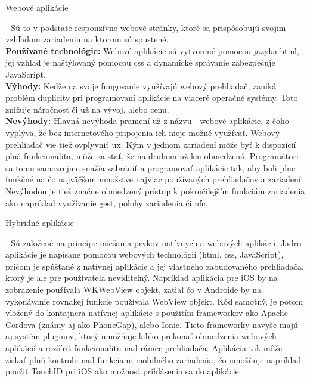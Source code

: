 \begin{itemize}[leftmargin=*]
{\bf \item Webové aplikácie} - Sú to v podstate responzívne webové stránky, ktoré sa prispôsobujú svojim vzhľadom zariadeniu na ktorom sú spustené. \cite{ma3} \\

{\bf Používané technológie:} Webové aplikácie sú vytvorené pomocou jazyka \acrshort{html}, jej vzhľad je naštýlovaný pomocou \acrshort{css} a dynamické správanie zabezpečuje JavaScript. \\

{\bf Výhody:} Keďže na svoje fungovanie využívajú webový prehliadač, zaniká problém duplicity pri programovaní aplikácie na viaceré operačné systémy. Toto znižuje náročnosť či už na vývoj, alebo cenu. \cite{ma3} \\

{\bf Nevýhody:} Hlavná nevýhoda pramení už z názvu - webové aplikácie, z čoho vyplýva, že bez internetového pripojenia ich nieje možné využívať. Webový prehliadač vie tiež ovplyvniť \acrshort{ux}. Kým v jednom zariadení môže byť k dispozícií plná funkcionalita, môže sa stať, že na druhom už len obmedzená. Programátori sa tomu samozrejme snažia zabrániť a programovať aplikácie tak, aby boli plne funkčné na čo najväčšom množstve najviac používaných prehliadačov a zariadení. Nevýhodou je tiež značne obmedzený prístup k pokročilejším funkciám zariadenia ako napríklad využívanie gest, polohy zariadenia či \acrshort{nfc}. \cite{ma3} \\
 
{\bf \item Hybridné aplikácie} - Sú založené na princípe miešania prvkov natívnych a webových aplikácií. Jadro aplikácie je napísane pomocou webových technológií (\acrshort{html}, \acrshort{css}, JavaScript), pričom je spúšťané z natívnej aplikácie a jej vlastného zabudovaného prehliadača, ktorý je ale pre používateľa neviditeľný. Napríklad aplikácia pre iOS by na zobrazenie používala WKWebView objekt, zatiaľ čo v Androide by na vykonávanie rovnakej funkcie používala WebView objekt. Kód samotný, je potom vložený do kontajnera natívnej aplikácie s použitím frameworkov ako Apache Cordova (známy aj ako PhoneGap), alebo Ionic. Tieto frameworky navyše majú aj systém pluginov, ktorý umožňuje ľahko prekonať obmedzenia webových aplikácií a rozšíriť funkcionalitu nad rámec prehliadača. Aplikácia tak môže získať plnú kontrolu nad funkciami mobilného zariadenia, čo umožňuje napríklad použiť TouchID pri iOS ako možnosť prihlásenia sa do aplikácie. \cite{ma4} \\



\end{itemize}
